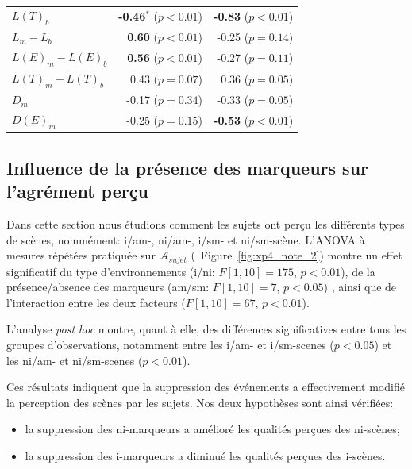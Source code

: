 \begin{table}[t]
\begin{tabular}{l r r}
$L(T)_b$           & \textbf{-0.46$^{*}$} ($p<0.01$) & \textbf{-0.83} ($p<0.01$) \\
$L_m-L_b$          & \textbf{0.60} ($p<0.01$)        & -0.25 ($p=0.14$) \\
$L(E)_m-L(E)_b$    & \textbf{0.56} ($p<0.01$)        & -0.27 ($p=0.11$) \\
$L(T)_m-L(T)_b$    & 0.43 ($p=0.07$)                 & 0.36 ($p=0.05$) \\
$D_m$              & -0.17 ($p=0.34$)                & -0.33 ($p=0.05$) \\
$D(E)_m$           & -0.25 ($p=0.15$)                & \textbf{-0.53} ($p<0.01$) \\
\hline
\end{tabular}
\vspace{0.5mm}
\caption{}
\label{tab:corrAmXP4}
\end{table}

\subsection{Influence de la présence des marqueurs sur l'agrément perçu}
\label{sec:ch5_Asujet}

Dans cette section nous étudions comment les sujets ont perçu les différents types de scènes, nommément: i/am-, ni/am-, i/sm- et ni/sm-scène. L'ANOVA à mesures répétées pratiquée sur $\mathcal{A}_{sujet}$ (\cf~Figure~\ref{fig:xp4_note_2}) montre un effet significatif du type d'environnements (i/ni: $F[1,10]=175$, $p<0.01$), de la présence/absence des marqueurs (am/sm: $F[1,10]=7$, $p<0.05$) , ainsi que de l'interaction entre les deux facteurs ($F[1,10]=67$, $p<0.01$).

L'analyse \emph{post hoc} montre, quant à elle, des différences significatives entre tous les groupes d'observations, notamment entre les i/am- et i/sm-scenes ($p<0.05$) et les ni/am- et ni/sm-scenes ($p<0.01$).


Ces résultats indiquent que la suppression des événements a effectivement modifié la perception des scènes par les sujets. Nos deux hypothèses sont ainsi vérifiées:

\begin{itemize}
\item la suppression des ni-marqueurs a amélioré les qualités perçues des ni-scènes;
\item la suppression des i-marqueurs a diminué les qualités perçues des i-scènes.
\end{itemize}

